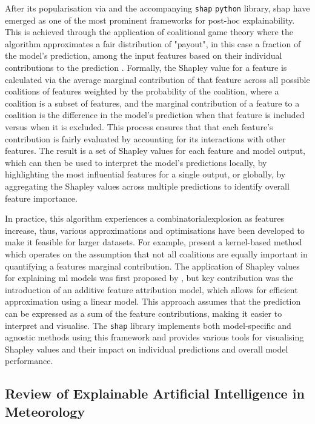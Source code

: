 After its popularisation via \cite{Lundberg2017} and the accompanying \texttt{shap} \texttt{python} library, \acrfull{shap} have emerged as one of the most prominent frameworks for post-hoc explainability. This is achieved through the application of coalitional game theory where the algorithm approximates a fair distribution of "payout", in this case a fraction of the model's prediction, among the input features based on their individual contributions to the prediction \citep{Shapley1953}. Formally, the Shapley value for a feature is calculated via the average marginal contribution of that feature across all possible coalitions of features weighted by the probability of the coalition, where a coalition is a subset of features, and the marginal contribution of a feature to a coalition is the difference in the model's prediction when that feature is included versus when it is excluded. This process ensures that that each feature's contribution is fairly evaluated by accounting for its interactions with other features. The result is a set of Shapley values for each feature and model output, which can then be used to interpret the model's predictions locally, by highlighting the most influential features for a single output, or globally, by aggregating the Shapley values across multiple predictions to identify overall feature importance.

In practice, this algorithm experiences a \gls{combinatorialexplosion} as features increase, thus, various approximations and optimisations have been developed to make it feasible for larger datasets. For example, \cite{Lundberg2017} present a kernel-based method which operates on the assumption that not all coalitions are equally important in quantifying a features marginal contribution. The application of Shapley values for explaining \acrshort{ml} models was first proposed by \cite{trumbelj2011}, but \cite{Lundberg2017} key contribution was the introduction of an additive feature attribution model, which allows for efficient approximation using a linear model. This approach assumes that the prediction can be expressed as a sum of the feature contributions, making it easier to interpret and visualise. The \texttt{shap} library implements both model-specific and agnostic methods using this framework and provides various tools for visualising Shapley values and their impact on individual predictions and overall model performance.

\subsection{Review of Explainable Artificial Intelligence in Meteorology}


